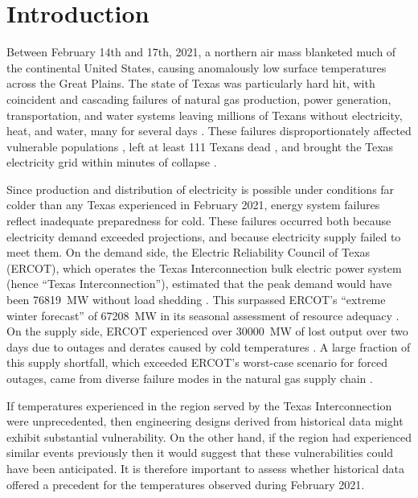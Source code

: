 \documentclass[12pt]{iopart}
\begin{document}
\section{Introduction}

Between February 14th and 17th, 2021, a  northern air mass blanketed much of the continental United States, causing anomalously low surface temperatures across the Great Plains.
The state of Texas was particularly hard hit, with coincident and cascading failures of natural gas production, power generation, transportation, and water systems leaving millions of Texans without electricity, heat, and water, many for several days \cite{ceser_winterupdate:2021,clack_uri:2021,smead_eyesoftx:2021}.
These failures disproportionately affected vulnerable populations \cite{dobbins_blackoutdisparity:2021}, left at least 111 Texans dead \cite{mulcahy_urideath:2021}, and brought the Texas electricity grid within minutes of collapse \cite{magness_review:2021}.

Since production and distribution of electricity is possible under conditions far colder than any Texas experienced in February 2021, energy system failures reflect inadequate preparedness for cold.
These failures occurred both because electricity demand exceeded projections, and because electricity supply failed to meet them.
On the demand side, the Electric Reliability Council of Texas (ERCOT), which operates the Texas Interconnection bulk electric power system (hence ``Texas Interconnection''), estimated that the peak demand would have been \SI{76819}{\mega\watt} without load shedding \cite{magness_review:2021}.
This surpassed ERCOT's ``extreme winter forecast'' of \SI{67208}{\mega\watt} in its seasonal assessment of resource adequacy \cite{ercotpublic_sarawinter:2020}.
On the supply side, ERCOT experienced over \SI{30000}{\mega\watt} of lost output over two days due to outages and derates caused by cold temperatures \cite{ercotpublic_outagesv2:2021}.
A large fraction of this supply shortfall, which exceeded ERCOT's worst-case scenario for forced outages, came from diverse failure modes in the natural gas supply chain \cite{ercotpublic_outagesv2:2021,smead_eyesoftx:2021,ceser_winterupdate:2021}.

If temperatures experienced in the region served by the Texas Interconnection were unprecedented, then engineering designs derived from  historical data might exhibit substantial vulnerability.
On the other hand, if the region had experienced similar events previously then it would suggest that these vulnerabilities could have been anticipated.
It is therefore important to assess whether historical data offered a precedent for the temperatures observed during February 2021.
\end{document}
